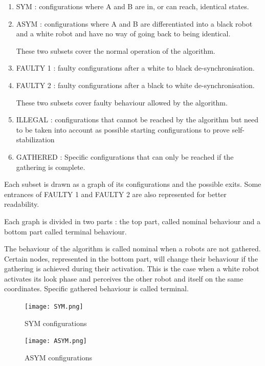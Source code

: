 \documentclass[11pt]{article}
\begin{document}
\begin{enumerate}[label=(\alph*)]
\item SYM : configurations where A and B are in, or can reach, identical states.
\item ASYM : configurations where A and B are differentiated into a black robot and a white robot and have no way of going back to being identical.

These two subsets cover the normal operation of the algorithm.

\item FAULTY 1 : faulty configurations after a white to black de-synchronisation.
\item FAULTY 2 : faulty configurations after a black to white de-synchronisation.

These two subsets cover faulty behaviour allowed by the algorithm.

\item ILLEGAL : configurations that cannot be reached by the algorithm but need to be taken into account as possible starting configurations to prove self-stabilization
\item GATHERED : Specific configurations that can only be reached if the gathering is complete.
  

\end{enumerate}


Each subset is drawn as a graph of its configurations and the possible exits. Some entrances of FAULTY 1 and FAULTY 2 are also represented for better readability.

Each graph is divided in two parts : the top part, called nominal behaviour and a bottom part called terminal behaviour. 

The behaviour of the algorithm is called nominal when a robots are not gathered. Certain nodes, represented in the bottom part, will change their behaviour if the gathering is achieved during their activation. This is the case when a white robot activates its look phase and perceives the other robot and itself on the same coordinates. Specific gathered behaviour is called terminal.



\pagebreak
\begin{figure}[htb]
	\centering
	\texttt{[image: SYM.png]}
	\caption{SYM configurations}
\end{figure}
\pagebreak

\begin{figure}[htb]
	\centering
	\texttt{[image: ASYM.png]}
	\caption{ASYM configurations}
\end{figure}
\pagebreak
\end{document}
